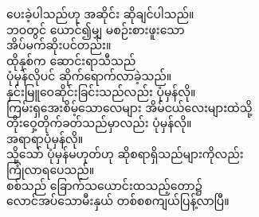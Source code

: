\documentclass[conference]{IEEEtran}
\begin{document}
{{{ပေးခဲ့ပါသည်ဟု အဆိုင်း ဆိုချင်ပါသည်။\\
ဘဝတွင် ယောင်၍မျှ မစဉ်းစားဖူးသော\\
အိပ်မက်ဆိုးပင်တည်း။\\
ထိုနှစ်က ဆောင်းရာသီသည်\\
ပုံမှန်လိုပင် ဆိုက်ရောက်လာခဲ့သည်။\\
နှင်းမြူဝေဆိုင်းခြင်းသည်လည်း ပုံမှန်လို။\\
ကြမ်းရှအေးစိမ့်သောလေများ အိမ်ငယ်လေးများထဲသို့\\
တိုးဝှေ့တိုက်ခတ်သည်မှာလည်း ပုံမှန်လို။\\
အရာရာပုံမှန်လို။\\
သို့သော် ပုံမှန်မဟုတ်ဟု ဆိုစရာရှိသည်များကိုလည်း\\
ကြုံလာရပေသည်။\\
စစ်သည် ခြောက်သယောင်းထသည့်တော၌\\
လောင်အပ်သောမီးနှယ် တစ်စစကျယ်ပြန့်လာပြီ။\\}

\begin{figure}[h!]
\end{figure}

}}
\end{document}
